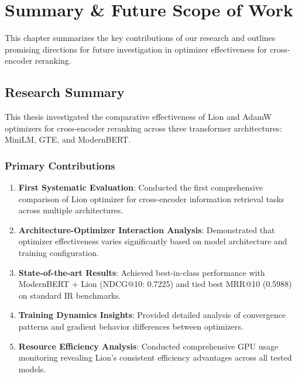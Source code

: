 
\chapter{Summary \& Future Scope of Work}
\label{Chapter6}

This chapter summarizes the key contributions of our research and outlines promising directions for future investigation in optimizer effectiveness for cross-encoder reranking.

\section{Research Summary}

This thesis investigated the comparative effectiveness of Lion and AdamW optimizers for cross-encoder reranking across three transformer architectures: MiniLM, GTE, and ModernBERT.

\subsection{Primary Contributions}

\begin{enumerate}
    \item \textbf{First Systematic Evaluation}: Conducted the first comprehensive comparison of Lion optimizer for cross-encoder information retrieval tasks across multiple architectures.
    
    \item \textbf{Architecture-Optimizer Interaction Analysis}: Demonstrated that optimizer effectiveness varies significantly based on model architecture and training configuration.
    
    \item \textbf{State-of-the-art Results}: Achieved best-in-class performance with ModernBERT + Lion (NDCG@10: 0.7225) and tied best MRR@10 (0.5988) on standard IR benchmarks.
    
    \item \textbf{Training Dynamics Insights}: Provided detailed analysis of convergence patterns and gradient behavior differences between optimizers.
    
    \item \textbf{Resource Efficiency Analysis}: Conducted comprehensive GPU usage monitoring revealing Lion's consistent efficiency advantages across all tested models.
\end{enumerate}

